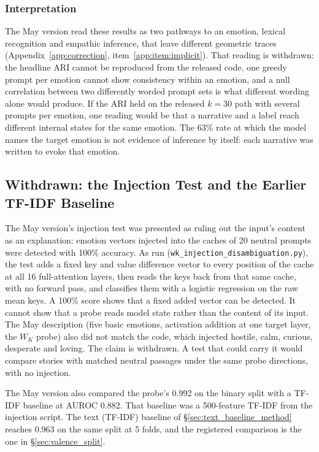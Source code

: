 \subsubsection{Interpretation}

The May version read these results as two pathways to an emotion, lexical recognition and empathic inference, that leave different geometric traces (Appendix~\ref{app:correction}, item~\ref{app:item:implicit}). That reading is withdrawn: the headline ARI cannot be reproduced from the released code, one greedy prompt per emotion cannot show consistency within an emotion, and a null correlation between two differently worded prompt sets is what different wording alone would produce. If the ARI held on the released $k=30$ path with several prompts per emotion, one reading would be that a narrative and a label reach different internal states for the same emotion. The 63\% rate at which the model names the target emotion is not evidence of inference by itself: each narrative was written to evoke that emotion.

\subsection{Withdrawn: the Injection Test and the Earlier TF-IDF Baseline}
\label{sec:injection_results}
\label{sec:text_baseline_results}

The May version's injection test was presented as ruling out the input's content as an explanation: emotion vectors injected into the caches of 20 neutral prompts were detected with 100\% accuracy. As run (\texttt{wk\_injection\_disambiguation.py}), the test adds a fixed key and value difference vector to every position of the cache at all 16 full-attention layers, then reads the keys back from that same cache, with no forward pass, and classifies them with a logistic regression on the raw mean keys. A 100\% score shows that a fixed added vector can be detected. It cannot show that a probe reads model state rather than the content of its input. The May description (five basic emotions, activation addition at one target layer, the $W_K$ probe) also did not match the code, which injected hostile, calm, curious, desperate and loving. The claim is withdrawn. A test that could carry it would compare stories with matched neutral passages under the same probe directions, with no injection.

The May version also compared the probe's 0.992 on the binary split with a TF-IDF baseline at AUROC 0.882. That baseline was a 500-feature TF-IDF from the injection script. The text (TF-IDF) baseline of \S\ref{sec:text_baseline_method} reaches 0.963 on the same split at 5 folds, and the registered comparison is the one in \S\ref{sec:valence_split}.


